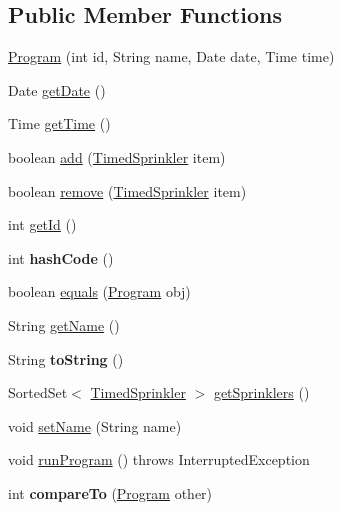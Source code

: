 \subsection*{Public Member Functions}
\begin{DoxyCompactItemize}
\item 
\hyperlink{classmodel_1_1Program_a6580a752cabd050b3e717b9f59257010}{Program} (int id, String name, Date date, Time time)
\item 
Date \hyperlink{classmodel_1_1Program_a07c6017d78569467ae4217ed87933498}{get\-Date} ()
\item 
Time \hyperlink{classmodel_1_1Program_a781bf64d5e29a0f857d0b9563c021aeb}{get\-Time} ()
\item 
boolean \hyperlink{classmodel_1_1Program_a5ee34c0bfa88ab0d6097091e710bdfd9}{add} (\hyperlink{classmodel_1_1TimedSprinkler}{Timed\-Sprinkler} item)
\item 
boolean \hyperlink{classmodel_1_1Program_a4ff329b2b132c99b350364e96ff33445}{remove} (\hyperlink{classmodel_1_1TimedSprinkler}{Timed\-Sprinkler} item)
\item 
int \hyperlink{classmodel_1_1Program_ad2341d28025213b84388cf5e3ec07fab}{get\-Id} ()
\item 
\hypertarget{classmodel_1_1Program_ae7e7a72285ff10446ce5b0b8193f576d}{int {\bfseries hash\-Code} ()}\label{classmodel_1_1Program_ae7e7a72285ff10446ce5b0b8193f576d}

\item 
boolean \hyperlink{classmodel_1_1Program_a9ae2c6573165fc32a5eba3bfa751bedc}{equals} (\hyperlink{classmodel_1_1Program}{Program} obj)
\item 
String \hyperlink{classmodel_1_1Program_a0a9a9037a0134dd5edc5daf037decce7}{get\-Name} ()
\item 
\hypertarget{classmodel_1_1Program_a1d12fed19095fc4c789716569abf4058}{String {\bfseries to\-String} ()}\label{classmodel_1_1Program_a1d12fed19095fc4c789716569abf4058}

\item 
Sorted\-Set$<$ \hyperlink{classmodel_1_1TimedSprinkler}{Timed\-Sprinkler} $>$ \hyperlink{classmodel_1_1Program_a2a8ca42dce071c88963d1be77ac80a9a}{get\-Sprinklers} ()
\item 
void \hyperlink{classmodel_1_1Program_ac6c3431fe0d1cc2245fad3d77b34d4f4}{set\-Name} (String name)
\item 
void \hyperlink{classmodel_1_1Program_a49d0f7485f5012791fd56928acb473ed}{run\-Program} ()  throws Interrupted\-Exception 
\item 
\hypertarget{classmodel_1_1Program_ae5dfdf7cf531a0b5edc40d8f64683d70}{int {\bfseries compare\-To} (\hyperlink{classmodel_1_1Program}{Program} other)}\label{classmodel_1_1Program_ae5dfdf7cf531a0b5edc40d8f64683d70}

\end{DoxyCompactItemize}


